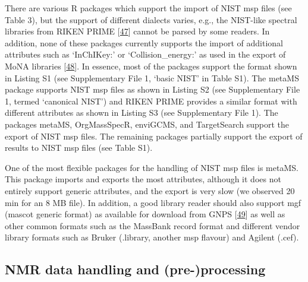 \documentclass[]{article}
\begin{document}
There are various R packages which support the import of NIST msp files (see Table 3), but the support of different dialects varies, e.g., the NIST-like spectral libraries from RIKEN PRIME {[}\protect\hyperlink{ref-tsugawa_2015}{47}{]} cannot be parsed by some readers. In addition, none of these packages currently supports the import of additional attributes such as `InChIKey:' or `Collision\_energy:' as used in the export of MoNA libraries {[}\protect\hyperlink{ref-massbankofnorthamerica_website_nd}{48}{]}. In essence, most of the packages support the format shown in Listing S1 (see Supplementary File 1, `basic NIST' in Table S1). The metaMS package supports NIST msp files as shown in Listing S2 (see Supplementary File 1, termed `canonical NIST') and RIKEN PRIME provides a similar format with different attributes as shown in Listing S3 (see Supplementary File 1). The packages metaMS, OrgMassSpecR, enviGCMS, and TargetSearch support the export of NIST msp files. The remaining packages partially support the export of results to NIST msp files (see Table S1).

One of the most flexible packages for the handling of NIST msp files is metaMS. This package imports and exports the most attributes, although it does not entirely support generic attributes, and the export is very slow (we observed 20 min for an 8 MB file). In addition, a good library reader should also support mgf (mascot generic format) as available for download from GNPS {[}\protect\hyperlink{ref-wang_2016}{49}{]} as well as other common formats such as the MassBank record format and different vendor library formats such as Bruker (.library, another msp flavour) and Agilent (.cef).

\newpage

\hypertarget{nmr-data-handling-and-pre-processing}{%
\subsection{NMR data handling and (pre-)processing}\label{nmr-data-handling-and-pre-processing}}
\end{document}
